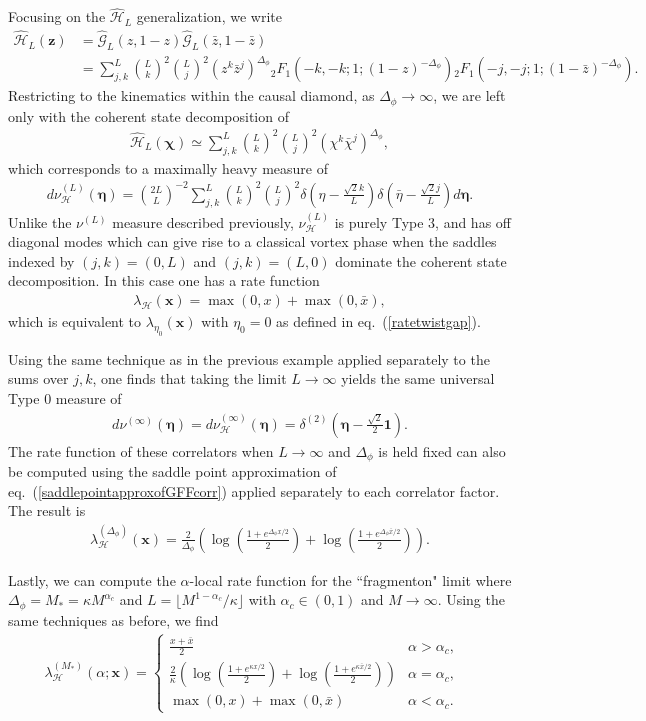 \documentclass[a4paper,11pt]{article}
\theoremstyle{plain}
\theoremstyle{definition}
\theoremstyle{remark}
\newcommand{\bs}[1]{\boldsymbol{#1}}
\newcommand{\ba}{\begin{equation} \begin{aligned}}
\newcommand{\ea}{\end{aligned} \end{equation}}
\newcommand{\Df}{\Delta_\phi}
\begin{document}
Focusing on the $\widehat{\mathcal{H}}_L$ generalization, we write
\ba
\widehat{\mathcal{H}}_L(\bs{z}) &= \widehat{\mathcal{G}}_L(z,1-z) \widehat{\mathcal{G}}_L(\bar{z},1-\bar{z})\\
&= \sum_{j,k}^L \binom{L}{k}^2\binom{L}{j}^2 (z^k \bar{z}^j)^{\Df} {}_2 F_1(-k,-k;1;(1-z)^{-\Df}) {}_2 F_1(-j,-j;1;(1-\bar{z})^{-\Df}).
\ea
Restricting to the kinematics within the causal diamond, as $\Df \to \infty$, we are left only with the coherent state decomposition of
\ba
\widehat{\mathcal{H}}_L(\bs{\chi}) \simeq  \sum_{j,k}^L \binom{L}{k}^2 \binom{L}{j}^2 \left( \chi^k \bar{\chi}^j\right)^{\Df}, 
\ea
which corresponds to a maximally heavy measure of 
\ba
d\nu_{\mathcal{H}}^{(L)}(\bs{\eta}) = \binom{2L}{L}^{-2} \sum_{j,k}^L \binom{L}{k}^2 \binom{L}{j}^2 \delta\left(\eta -\frac{\sqrt{2} k}{L} \right)\delta\left(\bar{\eta} -\frac{\sqrt{2} j}{L} \right)d\bs{\eta}.
\ea
Unlike the $\nu^{(L)}$ measure described previously, $\nu_{\mathcal{H}}^{(L)}$ is purely Type 3, and has off diagonal modes which can give rise to a classical vortex phase when the saddles indexed by $(j,k) = (0,L)$ and $(j,k) = (L,0)$ dominate the coherent state decomposition. In this case one has a rate function
\ba
\lambda_{\mathcal{H}}(\bs{x}) = \max(0,x) + \max(0,\bar{x}),
\ea
which is equivalent to $\lambda_{\eta_0}(\bs{x})$ with $\eta_0 = 0$ as defined in eq.~(\ref{ratetwistgap}).

Using the same technique as in the previous example applied separately to the sums over $j,k$, one finds that taking the limit $L \to \infty$ yields the same universal Type 0 measure of
\ba
d\nu^{(\infty)}(\bs{\eta}) = d\nu^{(\infty)}_{\mathcal{H}}(\bs{\eta}) = \delta^{(2)}\left(\bs{\eta} - \frac{\sqrt{2}}{2} \bs{1} \right).
\ea
The rate function of these correlators when $L \to \infty$ and $\Df$ is held fixed can also be computed using the saddle point approximation of eq.~(\ref{saddlepointapproxofGFFcorr}) applied separately to each correlator factor. The result is 
\ba
\lambda_{\mathcal{H}}^{(\Df)}(\bs{x}) = \frac{2}{\Df} \left( \log\left(\frac{1 + e^{\Df x/2}}{2}\right) + \log\left(\frac{1 + e^{\Df \bar{x}/2}}{2}\right) \right).
\ea

Lastly, we can compute the $\alpha$-local rate function for the ``fragmenton" limit where $\Df = M_*= \kappa M^{\alpha_c}$ and $L =\lfloor M^{1-\alpha_c}/\kappa \rfloor$ with $\alpha_c \in (0,1)$ and $M\to\infty$. Using the same techniques as before, we find
\ba
\label{eq:fragmenton_alpha_local}
\lambda^{(M_*)}_{\mathcal{H}}(\alpha;\bs{x})  =  \begin{cases}
\displaystyle \frac{x+\bar{x}}{2} & \alpha > \alpha_c, \quad \\
\displaystyle \frac{2}{\kappa}\left( \log \left( \frac{1 + e^{\kappa x / 2}}{2} \right)+\log \left( \frac{1 + e^{\kappa \bar{x} / 2}}{2} \right) \right) & \alpha = \alpha_c, \, \\
\max(0,x)+\max(0,\bar{x})  & \alpha < \alpha_c. \quad 
\end{cases}
\ea
\end{document}
